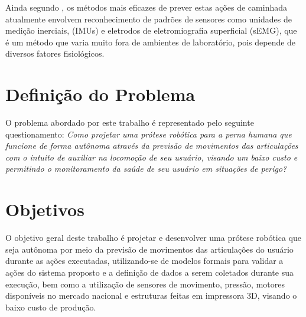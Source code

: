 Ainda segundo , os métodos mais eficazes de prever estas ações de caminhada atualmente envolvem reconhecimento de padrões de sensores como unidades de medição inerciais, (IMUs) e eletrodos de eletromiografia superficial (sEMG), que é um método que varia muito fora de ambientes de laboratório, pois depende de diversos fatores fisiológicos.



\section{Definição do Problema}
O problema abordado por este trabalho é representado pelo seguinte questionamento: \textit{Como projetar uma prótese robótica para a perna humana que funcione de forma autônoma através da previsão de movimentos das articulações com o intuito de auxiliar na locomoção de seu usuário, visando um baixo custo e permitindo o monitoramento da saúde de seu usuário em situações de perigo?}	

\section{Objetivos}
\label{sec:objetivos}
O objetivo geral deste trabalho é projetar e desenvolver uma prótese robótica que seja autônoma por meio da previsão de movimentos das articulações do usuário durante as ações executadas, utilizando-se de modelos formais para validar a ações do sistema proposto e a definição de dados a serem coletados durante sua execução, bem como a utilização de sensores de movimento, pressão, motores disponíveis no mercado nacional e estruturas feitas em impressora 3D, visando o baixo custo de produção.


